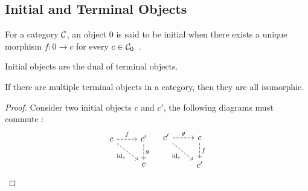 \subsection{Initial and Terminal Objects}

\begin{definition}
  For a category $\mathcal{C}$, an object $0$ is said to be initial when there exists a
  unique morphism $f: 0\to c$ for every $c\in
  \mathcal{C}_0$~\parencite{awodey:category_theory}.
\end{definition}

\begin{remark}
  Initial objects are the dual of terminal objects.
\end{remark}

\begin{theorem}
  If there are multiple terminal objects in a category, then they are all
  isomorphic.

  \begin{proof}
    Consider two initial objects $c$ and $c'$, the following diagrams must
    commute :
    \[\begin{tikzcd}
      c & {c'} \\
      & c
      \arrow["{\id_c}"', dashed, from=1-1, to=2-2]
      \arrow["f", dashed, from=1-1, to=1-2]
      \arrow["g", dashed, from=1-2, to=2-2]
    \end{tikzcd}
    \quad
    \begin{tikzcd}
      {c'} & c \\
      & {c'}
      \arrow["{\id_c}"', dashed, from=1-1, to=2-2]
      \arrow["g", dashed, from=1-1, to=1-2]
      \arrow["f", dashed, from=1-2, to=2-2]
    \end{tikzcd}\]
  \end{proof}
\end{theorem}

